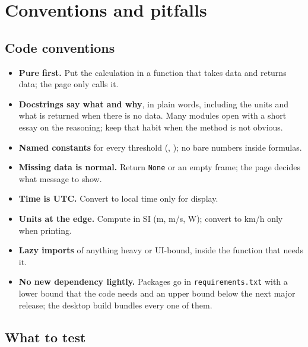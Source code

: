 \chapter{Conventions and pitfalls}\label{ch:conventions}

\section{Code conventions}

\begin{itemize}
\item \textbf{Pure first.} Put the calculation in a function that takes data and returns data; the page only calls it.
\item \textbf{Docstrings say what and why}, in plain words, including the units and what is returned when there is
  no data. Many modules open with a short essay on the reasoning; keep that habit when the method is not obvious.
\item \textbf{Named constants} for every threshold (, ); no bare
  numbers inside formulas.
\item \textbf{Missing data is normal.} Return \texttt{None} or an empty frame; the page decides what message to show.
\item \textbf{Time is UTC.} Convert to local time only for display.
\item \textbf{Units at the edge.} Compute in SI (m, m/s, W); convert to km/h only when printing.
\item \textbf{Lazy imports} of anything heavy or UI-bound, inside the function that needs it.
\item \textbf{No new dependency lightly.} Packages go in \texttt{requirements.txt} with a lower bound that the code
  needs and an upper bound below the next major release; the desktop build bundles every one of them.
\end{itemize}

\section{What to test}

